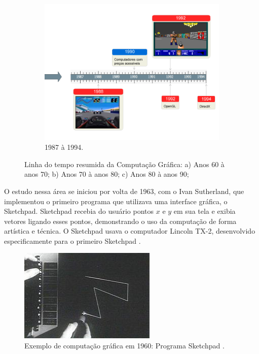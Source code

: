 \begin{figure}
\begin{subfigure}[t]{.8\textwidth}
    \includegraphics[scale=0.4]{img/timeline3}
    \caption{1987 à 1994.} 
  \end{subfigure}

  \caption{Linha do tempo resumida da Computação Gráfica: a) Anos 60 à anos 70; b) Anos 70 à anos 80; c) Anos 80 à anos 90;} \label{fig:timeline}
\end{figure}

O estudo nessa área se iniciou por volta de 1963, com o Ivan Sutherland, que implementou o primeiro programa que utilizava uma interface gráfica, o Sketchpad. Sketchpad recebia do usuário pontos $x$ e $y$ em sua tela e exibia vetores ligando esses pontos, demonstrando o uso da computação de forma artística e técnica. O Sketchpad usava o computador Lincoln TX-2, desenvolvido especificamente para o primeiro Sketchpad \cite{sketchpad}. 


 \begin{figure}[H]
    \centering
    \centerline{\includegraphics[width=.5\textwidth]{img/sketchpad}}
    \caption{Exemplo de computação gráfica em 1960: Programa Sketchpad \protect\footnotemark.}
\end{figure}

